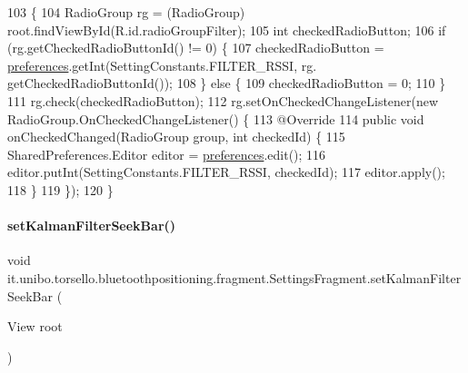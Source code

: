 \begin{DoxyCode}
103                                          \{
104         RadioGroup rg = (RadioGroup) root.findViewById(R.id.radioGroupFilter);
105         \textcolor{keywordtype}{int} checkedRadioButton;
106         \textcolor{keywordflow}{if} (rg.getCheckedRadioButtonId() != 0) \{
107             checkedRadioButton = \hyperlink{classit_1_1unibo_1_1torsello_1_1bluetoothpositioning_1_1fragment_1_1SettingsFragment_a52480c4d5d81ca59fe4a98ae3c623ea4_a52480c4d5d81ca59fe4a98ae3c623ea4}{preferences}.getInt(SettingConstants.FILTER\_RSSI, rg.
      getCheckedRadioButtonId());
108         \} \textcolor{keywordflow}{else} \{
109             checkedRadioButton = 0;
110         \}
111         rg.check(checkedRadioButton);
112         rg.setOnCheckedChangeListener(\textcolor{keyword}{new} RadioGroup.OnCheckedChangeListener() \{
113             @Override
114             \textcolor{keyword}{public} \textcolor{keywordtype}{void} onCheckedChanged(RadioGroup group, \textcolor{keywordtype}{int} checkedId) \{
115                 SharedPreferences.Editor editor = \hyperlink{classit_1_1unibo_1_1torsello_1_1bluetoothpositioning_1_1fragment_1_1SettingsFragment_a52480c4d5d81ca59fe4a98ae3c623ea4_a52480c4d5d81ca59fe4a98ae3c623ea4}{preferences}.edit();
116                 editor.putInt(SettingConstants.FILTER\_RSSI, checkedId);
117                 editor.apply();
118             \}
119         \});
120     \}
\end{DoxyCode}
\hypertarget{classit_1_1unibo_1_1torsello_1_1bluetoothpositioning_1_1fragment_1_1SettingsFragment_a84057f1633708ec85de5968ed9e7f032_a84057f1633708ec85de5968ed9e7f032}{}\label{classit_1_1unibo_1_1torsello_1_1bluetoothpositioning_1_1fragment_1_1SettingsFragment_a84057f1633708ec85de5968ed9e7f032_a84057f1633708ec85de5968ed9e7f032} 
\paragraph{\texorpdfstring{set\+Kalman\+Filter\+Seek\+Bar()}{setKalmanFilterSeekBar()}}
{\footnotesize\ttfamily void it.\+unibo.\+torsello.\+bluetoothpositioning.\+fragment.\+Settings\+Fragment.\+set\+Kalman\+Filter\+Seek\+Bar (\begin{DoxyParamCaption}\item[{View}]{root }\end{DoxyParamCaption})\hspace{0.3cm}{\ttfamily [private]}}


